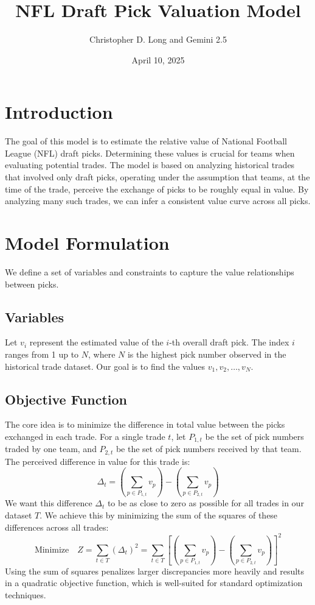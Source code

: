 \documentclass{article}
\title{NFL Draft Pick Valuation Model}
\author{Christopher D. Long and Gemini 2.5}
\date{April 10, 2025} %
\begin{document}
\maketitle

\section{Introduction}

The goal of this model is to estimate the relative value of National Football League (NFL) draft picks. Determining these values is crucial for teams when evaluating potential trades. The model is based on analyzing historical trades that involved only draft picks, operating under the assumption that teams, at the time of the trade, perceive the exchange of picks to be roughly equal in value. By analyzing many such trades, we can infer a consistent value curve across all picks.

\section{Model Formulation}

We define a set of variables and constraints to capture the value relationships between picks.

\subsection{Variables}
Let $v_i$ represent the estimated value of the $i$-th overall draft pick. The index $i$ ranges from 1 up to $N$, where $N$ is the highest pick number observed in the historical trade dataset. Our goal is to find the values $v_1, v_2, \dots, v_N$.

\subsection{Objective Function}
The core idea is to minimize the difference in total value between the picks exchanged in each trade. For a single trade $t$, let $P_{1,t}$ be the set of pick numbers traded by one team, and $P_{2,t}$ be the set of pick numbers received by that team. The perceived difference in value for this trade is:
\[
\Delta_t = \left( \sum_{p \in P_{1,t}} v_p \right) - \left( \sum_{p \in P_{2,t}} v_p \right)
\]
We want this difference $\Delta_t$ to be as close to zero as possible for all trades in our dataset $T$. We achieve this by minimizing the sum of the squares of these differences across all trades:
\[
\text{Minimize} \quad Z = \sum_{t \in T} (\Delta_t)^2 = \sum_{t \in T} \left[ \left( \sum_{p \in P_{1,t}} v_p \right) - \left( \sum_{p \in P_{2,t}} v_p \right) \right]^2
\]
Using the sum of squares penalizes larger discrepancies more heavily and results in a quadratic objective function, which is well-suited for standard optimization techniques.
\end{document}
